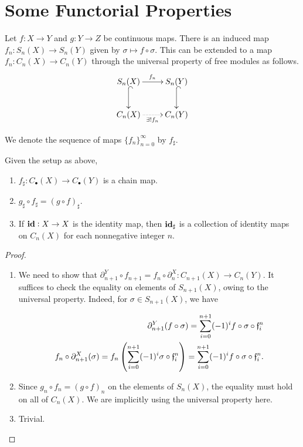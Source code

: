 \section{Some Functorial Properties}

Let $f: X\to Y$ and $g: Y\to Z$ be continuous maps. There is an induced map $f_n: S_n(X)\to S_n(Y)$ given by $\sigma\mapsto f\circ\sigma$. This can be extended to a map $f_n: C_n(X)\to C_n(Y)$ through the universal property of free modules as follows.
\begin{equation*}
    \xymatrix {
        S_n(X)\ar@{^{(}->}[d]\ar[r]^{f_n} & S_n(Y)\ar@{^{(}->}[d]\\
        C_n(X)\ar@{.>}[r]_{\exists! f_n} & C_n(Y)
    }
\end{equation*}

We denote the sequence of maps $\{f_n\}_{n = 0}^\infty$ by $f_\sharp$.

\begin{proposition}
    Given the setup as above, 
    \begin{enumerate}[label=(\alph*)]
        \item $f_\sharp: C_\bullet(X)\to C_\bullet(Y)$ is a chain map.
        \item $g_\sharp\circ f_\sharp = (g\circ f)_\sharp$.
        \item If $\mathbf{id}: X\to X$ is the identity map, then $\mathbf{id}_\sharp$ is a collection of identity maps on $C_n(X)$ for each nonnegative integer $n$.
    \end{enumerate}
\end{proposition}
\begin{proof}
\begin{enumerate}[label=(\alph*)]
    \item We need to show that $\partial^Y_{n + 1}\circ f_{n + 1} = f_n\circ\partial^X_n: C_{n + 1}(X)\to C_n(Y)$. It suffices to check the equality on elements of $S_{n + 1}(X)$, owing to the universal property. Indeed, for $\sigma\in S_{n + 1}(X)$, we have 

    \begin{align*}
        \partial_{n + 1}^Y(f\circ\sigma) = \sum_{i = 0}^{n + 1}(-1)^i f\circ\sigma\circ\mathfrak f^n_i\\
        f_n\circ\partial_{n + 1}^{X}(\sigma) = f_n\left(\sum_{i = 0}^{n + 1}(-1)^i\sigma\circ\mathfrak f_i^{n}\right) = \sum_{i = 0}^{n + 1}(-1)^i f\circ\sigma\circ\mathfrak f_i^n.
    \end{align*}
    
    \item Since $g_n\circ f_n = (g\circ f)_n$ on the elements of $S_n(X)$, the equality must hold on all of $C_n(X)$. We are implicitly using the universal property here.

    \item Trivial.\qedhere
\end{enumerate}
\end{proof}

